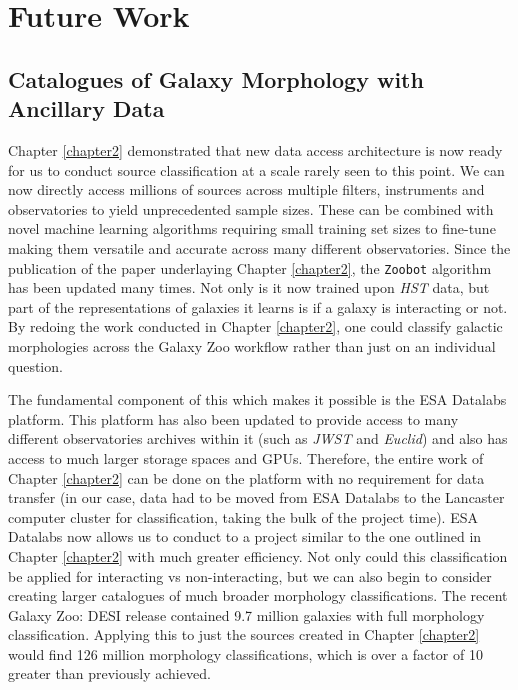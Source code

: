 \section{Future Work}
\subsection{Catalogues of Galaxy Morphology with Ancillary Data}
\noindent Chapter \ref{chapter2} demonstrated that new data access architecture is now ready for us to conduct source classification at a scale rarely seen to this point. We can now directly access millions of sources across multiple filters, instruments and observatories to yield unprecedented sample sizes. These can be combined with novel machine learning algorithms requiring small training set sizes to fine-tune making them versatile and accurate across many different observatories. Since the publication of the paper underlaying Chapter \ref{chapter2}, the \texttt{Zoobot} algorithm has been updated many times. Not only is it now trained upon \textit{HST} data, but part of the representations of galaxies it learns is if a galaxy is interacting or not. By redoing the work conducted in Chapter \ref{chapter2}, one could classify galactic morphologies across the Galaxy Zoo workflow rather than just on an individual question.

The fundamental component of this which makes it possible is the ESA Datalabs platform. This platform has also been updated to provide access to many different observatories archives within it (such as \emph{JWST} and \emph{Euclid}) and also has access to much larger storage spaces and GPUs. Therefore, the entire work of Chapter \ref{chapter2} can be done on the platform with no requirement for data transfer (in our case, data had to be moved from ESA Datalabs to the Lancaster computer cluster for classification, taking the bulk of the project time). ESA Datalabs now allows us to conduct to a project similar to the one outlined in Chapter \ref{chapter2} with much greater efficiency. Not only could this classification be applied for interacting vs non-interacting, but we can also begin to consider creating larger catalogues of much broader morphology classifications. The recent Galaxy Zoo: DESI release contained 9.7 million galaxies with full morphology classification. Applying this to just the sources created in Chapter \ref{chapter2} would find 126 million morphology classifications, which is over a factor of 10 greater than previously achieved.

